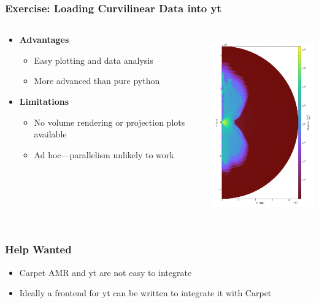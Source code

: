 \documentclass[]{beamer}
\begin{document}
\begin{frame}
  \frametitle{Exercise: Loading Curvilinear Data into yt}
  \begin{columns}
    \begin{column}{6cm}
      \begin{itemize}
      \item \textbf{\color{blue}Advantages}
        \begin{itemize}
        \item Easy plotting and data analysis
        \item More advanced than pure python
        \end{itemize}
      \item \textbf{\color{red}Limitations}
        \begin{itemize}
        \item No volume rendering or projection plots available
        \item Ad hoc---parallelism unlikely to work
        \end{itemize}
      \end{itemize}
    \end{column}
    \begin{column}{6cm}
      \begin{center}
        \includegraphics[height=7.9cm]{figures/harmdisk-xz-slice}
      \end{center}
    \end{column}
  \end{columns}
\end{frame}

\begin{frame}
  \frametitle{Help Wanted}
  \begin{itemize}
  \item Carpet AMR and yt are not easy to integrate
  \item Ideally a frontend for yt can be written to integrate it with Carpet
  \end{itemize}
\end{frame}
\end{document}
